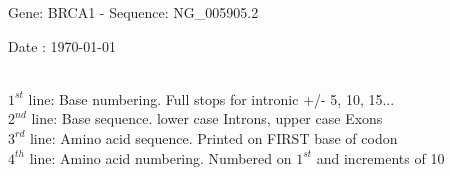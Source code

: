 \documentclass{article}
\begin{document}
\renewcommand{\footrulewidth}{1pt}
\renewcommand{\headrulewidth}{0pt}
\begin{center}
\begin{large}
 Gene: BRCA1 - Sequence: NG\_005905.2
 
 Date : \today\\\\
\end{large}
\end{center}
$1^{st}$ line: Base numbering. Full stops for intronic +/- 5, 10, 15...\\
$2^{nd}$ line: Base sequence. lower case Introns, upper case Exons\\
$3^{rd}$ line: Amino acid sequence. Printed on FIRST base of codon\\
$4^{th}$ line: Amino acid numbering. Numbered on $1^{st}$ and increments of 10\\
\end{document}

